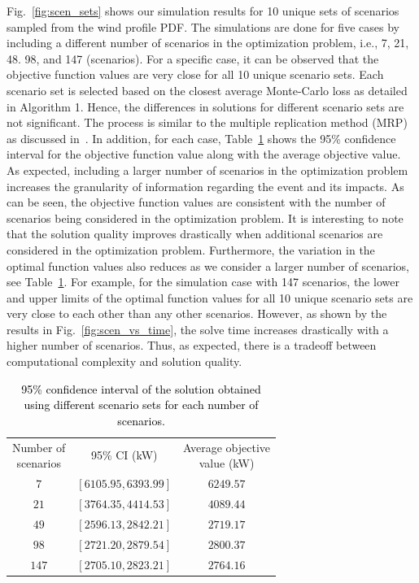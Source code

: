 \documentclass[hidelinks, 12pt]{article}
\begin{document}
Fig.~\ref{fig:scen_sets} shows our simulation results for 10 unique sets of scenarios sampled from the wind profile PDF. The simulations are done for five cases by including a different number of scenarios in the optimization problem, i.e., 7, 21, 48. 98, and 147 (scenarios). For a specific case, it can be observed that the objective function values are very close for all 10 unique scenario sets. Each scenario set is selected based on the closest average Monte-Carlo loss as detailed in Algorithm 1. Hence, the differences in solutions for different scenario sets are not significant. The process is similar to the multiple replication method (MRP) as discussed in~\cite{2021IASTATE}. In addition, for each case, Table~\ref{tab:95_CI} shows the 95\% confidence interval for the objective function value along with the average objective value. As expected, including a larger number of scenarios in the optimization problem increases the granularity of information regarding the event and its impacts. As can be seen, the objective function values are consistent with the number of scenarios being considered in the optimization problem. It is interesting to note that the solution quality improves drastically when additional scenarios are considered in the optimization problem. Furthermore, the variation in the optimal function values also reduces as we consider a larger number of scenarios, see Table~\ref{tab:95_CI}. For example, for the simulation case with 147 scenarios, the lower and upper limits of the optimal function values for all 10 unique scenario sets are very close to each other than any other scenarios. However, as shown by the results in Fig.~\ref{fig:scen_vs_time}, the solve time increases drastically with a higher number of scenarios. Thus, as expected, there is a tradeoff between computational complexity and solution quality.

\begin{table}[h]
    \centering
        \caption{\textcolor{black}{95\% confidence interval of the solution obtained using different scenario sets for each number of scenarios.}}
        {\color{black}
        \begin{tabular}{c|c|c}
        \hline
             \makecell{Number of \\ scenarios} & 95\% CI (kW) & \makecell{Average objective \\ value (kW)} \\
        \hhline{===}
             $7$ & $\left[6105.95, 6393.99\right]$ & $6249.57$ \\
        \hline
            $21$ & $[3764.35, 4414.53]$ & $4089.44$ \\
        \hline
            $49$ & $[2596.13, 2842.21]$ & $2719.17$ \\
        \hline
            $98$ & $[2721.20, 2879.54]$ & $2800.37$ \\
        \hline
            $147$ & $[2705.10, 2823.21]$ & $2764.16$ \\
        \hline
        \end{tabular}}
        \label{tab:95_CI}
    \end{table}
\end{document}
